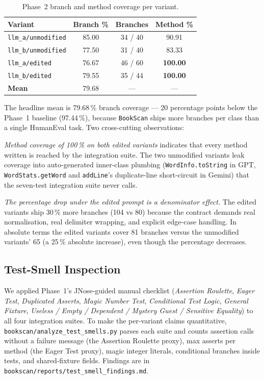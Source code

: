 \documentclass[journal]{IEEEtran}
\begin{document}
\begin{table}[!t]
\centering
\caption{Phase~2 branch and method coverage per variant.}
\label{tab:p2coverage}
\renewcommand{\arraystretch}{1.15}
\begin{tabular}{@{}l c c c@{}}
\toprule
\textbf{Variant} & \textbf{Branch \%} & \textbf{Branches} & \textbf{Method \%} \\
\midrule
\texttt{llm\_a/unmodified} & 85.00 & 34 / 40 & 90.91 \\
\texttt{llm\_b/unmodified} & 77.50 & 31 / 40 & 83.33 \\
\texttt{llm\_a/edited}     & 76.67 & 46 / 60 & \textbf{100.00} \\
\texttt{llm\_b/edited}     & 79.55 & 35 / 44 & \textbf{100.00} \\
\midrule
\textbf{Mean}              & 79.68 & --- & --- \\
\bottomrule
\end{tabular}
\end{table}

The headline mean is 79.68\,\% branch coverage --- 20
percentage points below the Phase~1 baseline (97.44\,\%),
because \texttt{BookScan} ships more branches per class than a
single HumanEval task. Two cross-cutting observations:

\emph{Method coverage of 100\,\% on both edited variants}
indicates that every method written is reached by the
integration suite. The two unmodified variants leak coverage
into auto-generated inner-class plumbing (\texttt{WordInfo.toString}
in GPT, \texttt{WordStats.getWord} and \texttt{addLine}'s
duplicate-line short-circuit in Gemini) that the seven-test
integration suite never calls.

\emph{The percentage drop under the edited prompt is a
denominator effect.} The edited variants ship 30\,\% more
branches (104 vs 80) because the contract demands real
normalisation, real delimiter wrapping, and explicit edge-case
handling. In absolute terms the edited variants cover 81
branches versus the unmodified variants' 65 (a 25\,\% absolute
increase), even though the percentage decreases.

\subsection{Test-Smell Inspection}
\label{sec:p2smells}

We applied Phase~1's JNose-guided manual checklist
(\emph{Assertion Roulette}, \emph{Eager Test}, \emph{Duplicated
Asserts}, \emph{Magic Number Test}, \emph{Conditional Test
Logic}, \emph{General Fixture}, \emph{Useless / Empty /
Dependent / Mystery Guest / Sensitive Equality}) to all four
integration suites. To make the per-variant claims
quantitative, \texttt{bookscan/analyze\_test\_smells.py}
parses each suite and counts assertion calls without a failure
message (the Assertion Roulette proxy), max asserts per method
(the Eager Test proxy), magic integer literals, conditional
branches inside tests, and shared-fixture fields. Findings are
in \texttt{bookscan/reports/test\_smell\_findings.md}.
\end{document}
